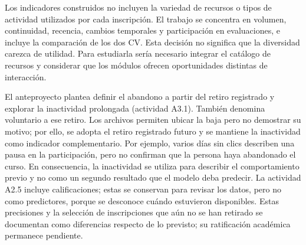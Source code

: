 Los indicadores construidos no incluyen la variedad de recursos o tipos de actividad utilizados por cada inscripción. El trabajo se concentra en volumen, continuidad, recencia, cambios temporales y participación en evaluaciones, e incluye la comparación de los dos CV. Esta decisión no significa que la diversidad carezca de utilidad. Para estudiarla sería necesario integrar el catálogo de recursos y considerar que los módulos ofrecen oportunidades distintas de interacción.

El anteproyecto plantea definir el abandono a partir del retiro registrado y explorar la inactividad prolongada (actividad A3.1). También denomina voluntario a ese retiro. Los archivos permiten ubicar la baja pero no demostrar su motivo; por ello, se adopta el retiro registrado futuro y se mantiene la inactividad como indicador complementario. Por ejemplo, varios días sin clics describen una pausa en la participación, pero no confirman que la persona haya abandonado el curso. En consecuencia, la inactividad se utiliza para describir el comportamiento previo y no como un segundo resultado que el modelo deba predecir. La actividad A2.5 incluye calificaciones; estas se conservan para revisar los datos, pero no como predictores, porque se desconoce cuándo estuvieron disponibles. Estas precisiones y la selección de inscripciones que aún no se han retirado se documentan como diferencias respecto de lo previsto; su ratificación académica permanece pendiente.

